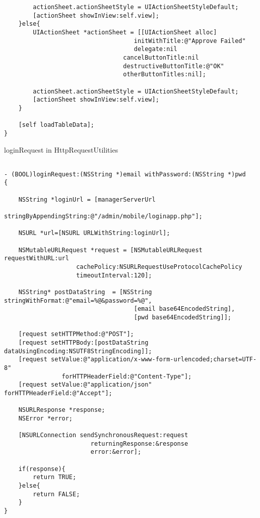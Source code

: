 \begin{appendices}
\begin{algorithm}[h]
\begin{verbatim}
        actionSheet.actionSheetStyle = UIActionSheetStyleDefault;
        [actionSheet showInView:self.view];
    }else{
        UIActionSheet *actionSheet = [[UIActionSheet alloc] 
        							initWithTitle:@"Approve Failed"
                                	delegate:nil
                                 cancelButtonTitle:nil
                                 destructiveButtonTitle:@"OK"
                                 otherButtonTitles:nil];
        
        actionSheet.actionSheetStyle = UIActionSheetStyleDefault;
        [actionSheet showInView:self.view];
    }
    
    [self loadTableData];
}
 \end{verbatim}
\end{algorithm}

\begin{algorithm}[h]
  \caption{loginRequest in HttpRequestUtilities}
  \label{code:ios_http_login}
  \begin{verbatim}
  
- (BOOL)loginRequest:(NSString *)email withPassword:(NSString *)pwd
{
    
    NSString *loginUrl = [managerServerUrl 
    				stringByAppendingString:@"/admin/mobile/loginapp.php"];
    
    NSURL *url=[NSURL URLWithString:loginUrl];
    
    NSMutableURLRequest *request = [NSMutableURLRequest requestWithURL:url
    				cachePolicy:NSURLRequestUseProtocolCachePolicy 
    				timeoutInterval:120];
    
    NSString* postDataString  = [NSString stringWithFormat:@"email=%@&password=%@",
    								[email base64EncodedString],
    								[pwd base64EncodedString]];
    
    [request setHTTPMethod:@"POST"];
    [request setHTTPBody:[postDataString dataUsingEncoding:NSUTF8StringEncoding]];
    [request setValue:@"application/x-www-form-urlencoded;charset=UTF-8" 
    			forHTTPHeaderField:@"Content-Type"];
    [request setValue:@"application/json" forHTTPHeaderField:@"Accept"];
    
    NSURLResponse *response;
    NSError *error;
    
    [NSURLConnection sendSynchronousRequest:request 
    					returningResponse:&response 
    					error:&error];
    
    if(response){
        return TRUE;
    }else{
        return FALSE;
    }
}


\end{verbatim}
\end{algorithm}
\end{appendices}
